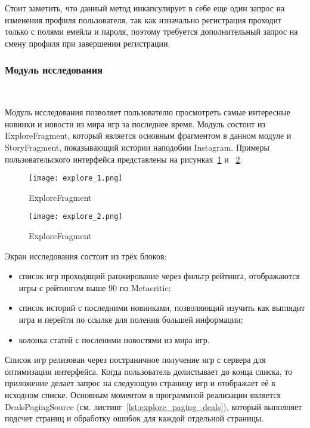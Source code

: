 Стоит заметить, что данный метод инкапсулирует в себе еще один запрос на изменения профиля пользователя, так как изначально регистрация проходит только с полями емейла и пароля, поэтому требуется дополнительный запрос на смену профиля при завершении регистрации.

\subsubsection{Модуль исследования}~\par
Модуль исследования позволяет пользователю просмотреть самые интересные новинки и новости из мира игр за последнее время. Модуль состоит из ExploreFragment, который является основным фрагментом в данном модуле и StoryFragment, показывающий истории наподобии Instagram. Примеры пользовательского интерфейса представлены на рисунках~\ref{fig:arch:explore_1} и ~\ref{fig:arch:explore_2}.

\begin{figure}[H]
 \centering
   \texttt{[image: explore\_1.png]} 
   \caption{ExploreFragment}
   \label{fig:arch:explore_1}
\end{figure}

\begin{figure}[H]
 \centering
   \texttt{[image: explore\_2.png]} 
   \caption{ExploreFragment}
   \label{fig:arch:explore_2}
\end{figure}

Экран исследования состоит из трёх блоков:

\begin{itemize}
  \item список игр проходящий ранжирование через фильтр рейтинга, отображаются игры с рейтингом выше 90 по Metacritic;
  \item список историй с последними новинками, позволяющий изучить как выглядит игра и перейти по ссылке для поления большей информации;
  \item колонка статей с посленими новостями из мира игр.
\end{itemize}

Список игр релизован через постраничное получение игр с сервера для оптимизации интерфейса. Когда пользователь долистывает до конца списка, то приложение делает запрос на следующую страницу игр и отображает её в исходном списке. Основным моментом в программной реализации является DealsPagingSource (см. листинг~\ref{lst:explore_paging_deals}), который выполняет подсчет страниц и обработку ошибок для каждой отдельной страницы.

